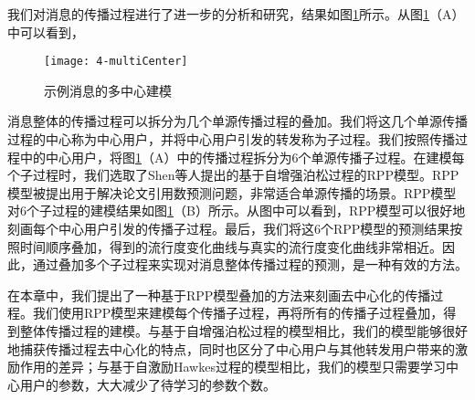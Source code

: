我们对消息的传播过程进行了进一步的分析和研究，结果如图\ref{fig:multiCenter}所示。从图\ref{fig:multiCenter}（A）中可以看到，
\begin{figure}[!htbp]
  \centering
  \texttt{[image: 4-multiCenter]}
  \caption{示例消息的多中心建模}
  \label{fig:multiCenter}
\end{figure}
消息整体的传播过程可以拆分为几个单源传播过程的叠加。我们将这几个单源传播过程的中心称为中心用户，并将中心用户引发的转发称为子过程。我们按照传播过程中的中心用户，将图\ref{fig:multiCenter}（A）中的传播过程拆分为6个单源传播子过程。在建模每个子过程时，我们选取了Shen等人提出的基于自增强泊松过程的RPP模型\citep{shen2014modeling}。RPP模型被提出用于解决论文引用数预测问题，非常适合单源传播的场景。RPP模型对6个子过程的建模结果如图\ref{fig:multiCenter}（B）所示。从图中可以看到，RPP模型可以很好地刻画每个中心用户引发的传播子过程。最后，我们将这6个RPP模型的预测结果按照时间顺序叠加，得到的流行度变化曲线与真实的流行度变化曲线非常相近。因此，通过叠加多个子过程来实现对消息整体传播过程的预测，是一种有效的方法。

在本章中，我们提出了一种基于RPP模型叠加的方法来刻画去中心化的传播过程。我们使用RPP模型来建模每个传播子过程，再将所有的传播子过程叠加，得到整体传播过程的建模。与基于自增强泊松过程的模型相比，我们的模型能够很好地捕获传播过程去中心化的特点，同时也区分了中心用户与其他转发用户带来的激励作用的差异；与基于自激励Hawkes过程的模型相比，我们的模型只需要学习中心用户的参数，大大减少了待学习的参数个数。

